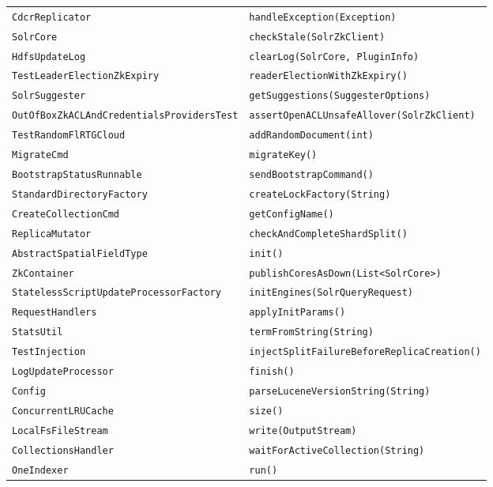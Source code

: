 \begin{center}
\begin{longtable}{ll}
\lstinline/CdcrReplicator/&{\lstinline/handleException(Exception)/}\\
\lstinline/SolrCore/&{\lstinline/checkStale(SolrZkClient)/}\\
\lstinline/HdfsUpdateLog/&{\lstinline/clearLog(SolrCore, PluginInfo)/}\\
\lstinline/TestLeaderElectionZkExpiry/&{\lstinline/readerElectionWithZkExpiry()/}\\
\lstinline/SolrSuggester/&{\lstinline/getSuggestions(SuggesterOptions)/}\\
\lstinline/OutOfBoxZkACLAndCredentialsProvidersTest/&{\lstinline/assertOpenACLUnsafeAllover(SolrZkClient)/}\\
\lstinline/TestRandomFlRTGCloud/&{\lstinline/addRandomDocument(int)/}\\
\lstinline/MigrateCmd/&{\lstinline/migrateKey()/}\\
\lstinline/BootstrapStatusRunnable/&{\lstinline/sendBootstrapCommand()/}\\
\lstinline/StandardDirectoryFactory/&{\lstinline/createLockFactory(String)/}\\
\lstinline/CreateCollectionCmd/&{\lstinline/getConfigName()/}\\
\lstinline/ReplicaMutator/&{\lstinline/checkAndCompleteShardSplit()/}\\
\lstinline/AbstractSpatialFieldType/&{\lstinline/init()/}\\
\lstinline/ZkContainer/&{\lstinline/publishCoresAsDown(List<SolrCore>)/}\\
\lstinline/StatelessScriptUpdateProcessorFactory/&{\lstinline/initEngines(SolrQueryRequest)/}\\
\lstinline/RequestHandlers/&{\lstinline/applyInitParams()/}\\
\lstinline/StatsUtil/&{\lstinline/termFromString(String)/}\\
\lstinline/TestInjection/&{\lstinline/injectSplitFailureBeforeReplicaCreation()/}\\
\lstinline/LogUpdateProcessor/&{\lstinline/finish()/}\\
\lstinline/Config/&{\lstinline/parseLuceneVersionString(String)/}\\
\lstinline/ConcurrentLRUCache/&{\lstinline/size()/}\\
\lstinline/LocalFsFileStream/&{\lstinline/write(OutputStream)/}\\
\lstinline/CollectionsHandler/&{\lstinline/waitForActiveCollection(String)/}\\
\lstinline/OneIndexer/&{\lstinline/run()/}\\

\end{longtable}
\end{center}
